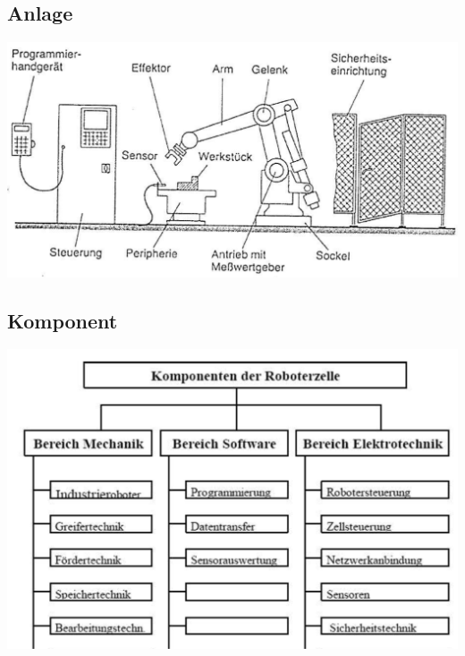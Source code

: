 \begin{minipage}{0.5\linewidth}
    \subsection{Anlage}
    \includegraphics[width=\linewidth]{./bilder/anlage.png}
\end{minipage}
\begin{minipage}{0.5\linewidth}
    \subsection{Komponent}
    \includegraphics[width=\linewidth]{./bilder/komponent.png}
\end{minipage}
